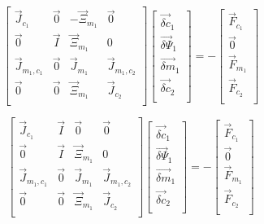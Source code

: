  \begin{equation}
\label{eqn:domainDecomp1}
 \begin{bmatrix} 
\vec{J}_{c_1} & \vec{0} & - \vec{\Xi}_{m_1} & \vec{0} \\
\vec{0} & \vec{I} & \vec{\Xi}_{m_1} & 0 \\
\vec{J}_{m_1,c_1} & \vec{0} & \vec{J}_{m_1} & \vec{J}_{m_1,c_2}  \\
\vec{0} & \vec{0} & \vec{\Xi}_{m_1} & \vec{J}_{c_2} \\
 \end{bmatrix} \begin{bmatrix}
 \vec{\delta c}_{1} \\
 \vec{\delta \Psi}_{1} \\
 \vec{\delta m}_{1} \\
 \vec{\delta c}_{2} \\
\end{bmatrix}  = -\begin{bmatrix}
 \vec{F}_{c_1} \\
 \vec{0} \\
 \vec{F}_{m_1} \\
 \vec{F}_{c_2} \\
\end{bmatrix}
 \end{equation} 
 
 \begin{equation}
\label{eqn:domainDecomp2}
 \begin{bmatrix} 
\vec{J}_{c_1} & \vec{I} & \vec{0} & \vec{0} \\
\vec{0} & \vec{I} & \vec{\Xi}_{m_1} & 0 \\
\vec{J}_{m_1,c_1} & \vec{0} & \vec{J}_{m_1} & \vec{J}_{m_1,c_2}  \\
\vec{0} & \vec{0} & \vec{\Xi}_{m_1} & \vec{J}_{c_2} \\
 \end{bmatrix} \begin{bmatrix}
 \vec{\delta c}_{1} \\
 \vec{\delta \Psi}_{1} \\
 \vec{\delta m}_{1} \\
 \vec{\delta c}_{2} \\
\end{bmatrix}  = -\begin{bmatrix}
 \vec{F}_{c_1} \\
 \vec{0} \\
 \vec{F}_{m_1} \\
 \vec{F}_{c_2} \\
\end{bmatrix}
 \end{equation}
 
